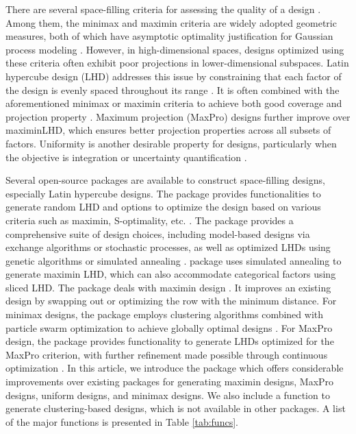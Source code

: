 There are several space-filling criteria for assessing the quality of a design \citep{joseph2016space}. Among them, the minimax and maximin criteria are widely adopted geometric measures, both of which have asymptotic optimality justification for Gaussian process modeling \citep{johnson1990minimax}. However, in high-dimensional spaces, designs optimized using these criteria often exhibit poor projections in lower-dimensional subspaces. Latin hypercube design (LHD) addresses this issue by constraining that each factor of the design is evenly spaced throughout its range \citep{mckay1979comparison}. It is often combined with the aforementioned minimax or maximin criteria to achieve both good coverage and projection property \citep{morris1995exploratory, van2008two}.  Maximum projection (MaxPro) designs further improve over maximinLHD, which ensures better projection properties across all subsets of factors. Uniformity is another desirable property for designs, particularly when the objective is integration or uncertainty quantification \citep{fang2005design}.

Several open-source packages are available to construct space-filling designs, especially Latin hypercube designs. The  package provides functionalities to generate random LHD and options to optimize the design based on various criteria such as maximin, S-optimality, etc. \citep{Carnell2024}. The  package provides a comprehensive suite of design choices, including model-based designs via exchange algorithms or stochastic processes, as well as optimized LHDs using genetic algorithms or simulated annealing \citep{dupuy2015dicedesign}.  package \citep{SLHD} uses simulated annealing to generate maximin LHD, which can also accommodate categorical factors using sliced LHD. The  package deals with maximin design \citep{maximin}. It improves an existing design by swapping out or optimizing the row with the minimum distance. For minimax designs, the  package employs clustering algorithms combined with particle swarm optimization to achieve globally optimal designs \citep{mak2021minimax}. For MaxPro design, the  package provides functionality to generate LHDs optimized for the MaxPro criterion, with further refinement made possible through continuous optimization \citep{maxpro}. In this article, we introduce the  package \citep{sfdesign} which offers considerable improvements over existing packages for generating maximin designs, MaxPro designs, uniform designs, and minimax designs. We also include a function to generate clustering-based designs, which is not available in other packages. A list of the major functions is presented in Table \ref{tab:funcs}.

